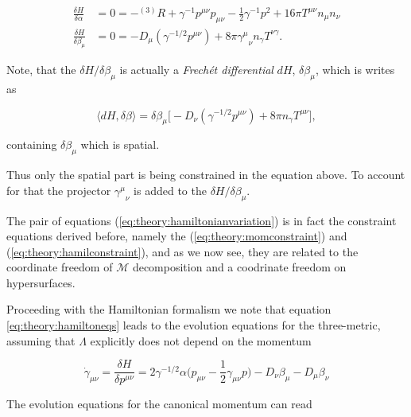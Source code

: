 \begin{align}
\frac{\delta H}{\delta \alpha} &= 0 = -{^{(3)}R} + \gamma^{-1}p^{\mu\nu}p_{\mu\nu}-\frac{1}{2}\gamma^{-1}p^2 + 16\pi T^{\mu\nu}n_{\mu}n_{\nu} \\
\frac{\delta H}{\delta \beta_{\mu}} &= 0 = - D_{\mu}(\gamma^{-1/2}p^{\mu\nu}) + 8\pi{\gamma^{\mu}}_{\nu}n_{\gamma}T^{\nu\gamma}.
\label{eq:theory:hamiltonianvariation}
\end{align}

Note, that the $\delta H / \delta\beta_{\mu}$ is actually a \textit{Frech\'et differential} $dH$, $\delta \beta_{\mu}$, which is writes as

\begin{equation}
\langle dH,\delta\beta \rangle = \delta\beta_{\mu}\big[-D_{\nu}(\gamma^{-1/2}p^{\mu\nu})+8\pi n_{\gamma}T^{\mu\nu}\big], 
\end{equation}

containing $\delta\beta_{\mu}$ which is spatial. 

Thus only the spatial part is being constrained in the equation above. 
To account for that the projector ${\gamma^{\mu}}_{\nu}$ is added to the $\delta H/\delta \beta_{\mu}$.

The pair of equations (\ref{eq:theory:hamiltonianvariation}) is in fact the constraint equations derived before, namely the (\ref{eq:theory:momconstraint}) and (\ref{eq:theory:hamilconstraint}), and as we now see, they are related to the coordinate freedom of $\mathcal{M}$ decomposition and a coodrinate freedom on hypersurfaces.


Proceeding with the Hamiltonian formalism we note that equation \ref{eq:theory:hamiltoneqs} leads to the evolution equations for the three-metric, assuming that $\Lambda$ explicitly does not depend on the momentum

\begin{equation}
\dot{\gamma}_{\mu\nu} =\frac{\delta H}{\delta p^{\mu\nu}} = 2\gamma^{-1/2}\alpha\big(p_{\mu\nu}-\frac{1}{2}\gamma_{\mu\nu}p\big) - D_{\nu}\beta_{\mu}-D_{\mu}\beta_{\nu}
\label{eq:theory:_adm_metric_evo}
\end{equation}

The evolution equations for the canonical momentum can read

